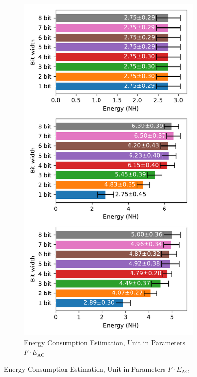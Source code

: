         \begin{figure}[H]
            \centering
            \begin{subfigure}[H]{0.7\textwidth}
                \centering
                \includegraphics[width=\textwidth]{../standard/FashionMNIST/plots/fashionmnist_test_energy_nh.pdf}
                \caption{Energy Consumption Estimation, Unit in Parameters $F\cdot E_{\text{AC}}$}
            \end{subfigure}
        \end{figure}
